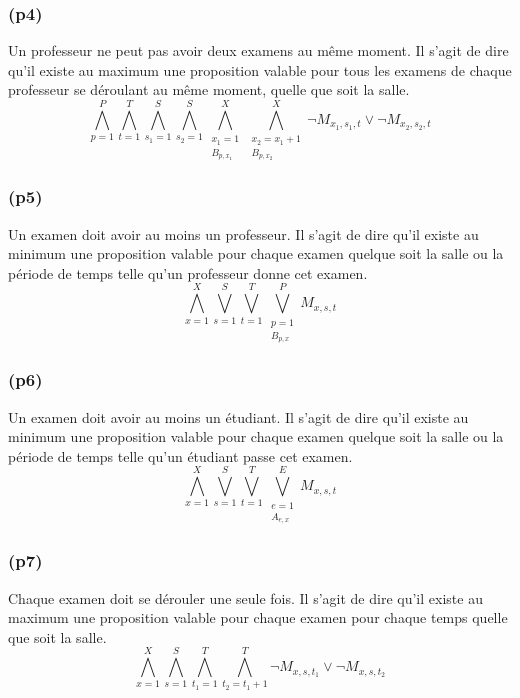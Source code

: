 \documentclass[a4paper,11pt]{article}
\begin{document}
\subsubsection{(p4)}
Un professeur ne peut pas avoir deux examens au même moment.
Il s'agit de dire qu'il existe au maximum une proposition valable pour tous les examens de chaque professeur se déroulant au même moment, quelle que soit la salle.
\begin{displaymath}
\bigwedge\limits_{p=1}^{P}\bigwedge\limits_{t=1}^{T}\bigwedge\limits_{s_{1}=1}^{S}\bigwedge\limits_{s_{2}=1}^{S}\bigwedge\limits_{\substack{x_{1}=1 \\ B_{p,x_{1}}}}^{X}\bigwedge\limits_{\substack{x_{2}=x_{1}+1 \\ B_{p,x_{2}}}}^{X} \neg M_{x_{1}, s_{1}, t} \vee \neg M_{x_{2}, s_{2}, t}
\end{displaymath}

\subsubsection{(p5)}
Un examen doit avoir au moins un professeur.
Il s'agit de dire qu'il existe au minimum une proposition valable pour chaque examen quelque soit la salle ou la période de temps telle qu'un professeur donne cet examen.
\begin{displaymath}
\bigwedge\limits_{x=1}^{X}\bigvee\limits_{s=1}^{S}\bigvee\limits_{t=1}^{T}\bigvee\limits_{\substack{p=1 \\ B_{p,x}}}^{P} M_{x, s, t}
\end{displaymath}

\subsubsection{(p6)}
Un examen doit avoir au moins un étudiant.
Il s'agit de dire qu'il existe au minimum une proposition valable pour chaque examen quelque soit la salle ou la période de temps telle qu'un étudiant passe cet examen.
\begin{displaymath}
\bigwedge\limits_{x=1}^{X}\bigvee\limits_{s=1}^{S}\bigvee\limits_{t=1}^{T}\bigvee\limits_{\substack{e=1 \\ A_{e,x}}}^{E} M_{x, s, t}
\end{displaymath}

\subsubsection{(p7)}
Chaque examen doit se dérouler une seule fois.
Il s'agit de dire qu'il existe au maximum une proposition valable pour chaque examen pour chaque temps quelle que soit la salle.
\begin{displaymath}
\bigwedge\limits_{x=1}^{X}\bigwedge\limits_{s=1}^{S}\bigwedge\limits_{t_{1}=1}^{T}\bigwedge\limits_{t_{2}=t_{1}+1}^{T} \neg M_{x, s, t_{1}} \vee \neg M_{x, s, t_{2}}
\end{displaymath}
\end{document}
